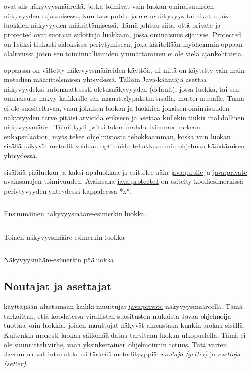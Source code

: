\documentclass{tufte-book}
\newcommand{\eng}[1]{\textit{(#1)}}
\newcommand{\new}[1]{\textit{\gls{#1}}}
\newcommand{\neweng}[2]{\new{#1} \eng{#2}}
\newcommand{\java}[1]{\underline{\gls{java:#1}}}
\newcommand{\code}[3]{
\begin{listing}
    \inputminted{java}{OhjelmointiopasEsimerkit/src/#1/#2.java}
    \caption{#3}
    \label{Java-#1-#2}
\end{listing}
}
\begin{document}
 ovat siis näkyvyysmääreitä, jotka toimivat vain luokan
ominaisuuksien näkyvyyden rajaamisessa, kun taas public ja oletusnäkyvyys toimivat myös luokkien
näkyvyyden määrittämisessä. Tämä johtuu siitä, että private ja protected ovat suoraan sidottuja
luokkaan, jossa ominaisuus sijaitsee. Protected on lisäksi tiukasti sidoksissa periytymiseen, joka
käsitellään myöhemmin oppaan alaluvussa  joten sen toiminnallisuuden
ymmärtäminen ei ole vielä ajankohtaista.

 oppaassa on vältetty näkyvyysmääreiden käyttöä, eli niitä on käytetty
vain main-metodien määrittelemisen yhteydessä. Tällöin Java-kääntäjä asettaa näkyvyydeksi
automaattisesti oletusnäkyvyyden (default), jossa luokka, tai sen ominaisuus näkyy kaikkialle
sen määrittelypaketin sisällä, muttei muualle. Tämä ei ole suositeltavaa, vaan jokaisen luokan
ja luokkien jokaisen ominaisuuden näkyvyyden tarve pitäisi arvioida erikseen ja asettaa kullekin
tiukin mahdollinen näkyvyysmääre. Tämä tyyli paitsi takaa mahdollisimman korkean enkapsulaation,
myös tekee ohjelmistosta tehokkaamman, koska vain luokan sisällä näkyvät metodit voidaan optimoida
tehokkaammin ohjelman kääntämisen yhteydessä.

 sisältää pääluokan ja kaksi apuluokkaa ja esittelee näin
\java{public} ja \java{private} avainsanojen toimivuuden. Avainsana \java{protected} on esitelty
koodiesimerkissä periytyvyyden yhteydessä kappaleessa *x*. %

\code{week2/accessmodifierexample}{FirstClass}{Ensimmäinen näkyvyysmääre-esimerkin luokka}
\code{week2/accessmodifierexample}{SecondClass}{Toinen näkyvyysmääre-esimerkin luokka}
\code{week2/accessmodifierexample}{Main}{Näkyvyysmääre-esimerkin pääluokka}

\subsection{Noutajat ja asettajat}
\label{get set}

 käyttäjiään alustamaan kaikki muuttujat \java{private} näkyvyysmääreellä.
Tämä tarkoittaa, että koodatessa virallisten suositusten mukaista Javaa ohjelmoija tuottaa vain
luokkia, joiden muuttujat näkyvät ainoastaan kunkin luokan sisällä. Kuitenkin monesti luokan
säilömää dataa tarvitaan luokan ulkopuolella. Tämä ei ole suunnitteluvirhe, vaan yksinkertainen
ohjelmoinnin totuus. Tätä varten Javaan on vakiintunut kaksi tärkeää metodityyppiä:
\neweng{noutaja}{getter} ja \neweng{asettaja}{setter}.
\end{document}
